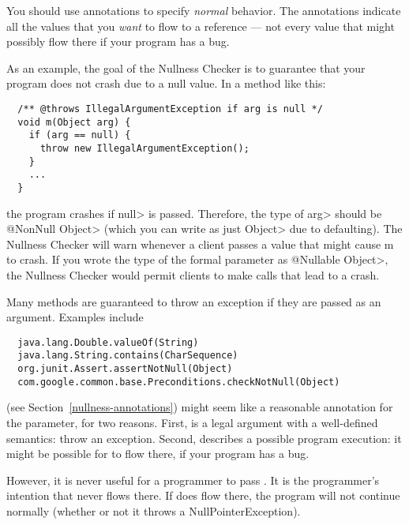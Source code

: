 
You should use annotations to specify \emph{normal} behavior.  The
annotations indicate all the values that you \emph{want} to flow to a
reference --- not every value that might possibly flow there if your
program has a bug.

As an example, the goal of the Nullness Checker is to guarantee that your
program does not crash due to a null value.  In a method like this:

\begin{Verbatim}
  /** @throws IllegalArgumentException if arg is null */
  void m(Object arg) {
    if (arg == null) {
      throw new IllegalArgumentException();
    }
    ...
  }
\end{Verbatim}

\noindent
the program crashes if \<null> is passed.  Therefore, the type of \<arg>
should be \<@NonNull Object> (which you can write as just \<Object> due to
defaulting).  The Nullness Checker will warn whenever a client passes a
value that might cause m to crash.  If you wrote the type of the formal
parameter as \<@Nullable Object>, the Nullness Checker would permit clients
to make calls that lead to a crash.


Many methods are guaranteed to throw an exception if they are passed 
as an argument.  Examples include

\begin{Verbatim}
  java.lang.Double.valueOf(String)
  java.lang.String.contains(CharSequence)
  org.junit.Assert.assertNotNull(Object)
  com.google.common.base.Preconditions.checkNotNull(Object)
\end{Verbatim}

 (see Section~\ref{nullness-annotations})
might seem like a reasonable annotation for the parameter,
for two reasons.  First,  is a legal argument with a
well-defined semantics:  throw an exception.  Second, 
describes a possible program execution:  it might be possible for
 to flow there, if your program has a bug.


However, it is never useful for a programmer to pass .  It is
the programmer's intention that  never flows there.  If
 does flow there, the program will not continue normally
(whether or not it throws a NullPointerException).

